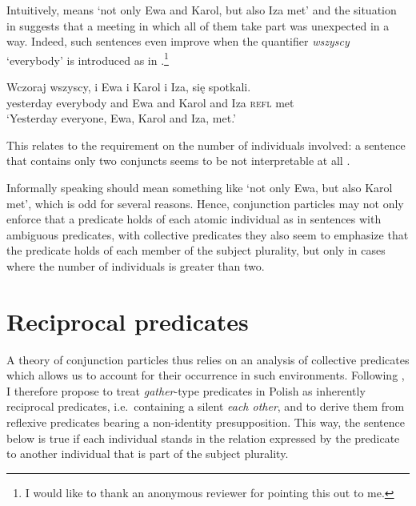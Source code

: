 \documentclass[output=paper]{langscibook}
\begin{document}
\noindent Intuitively,  means `not only Ewa and Karol, but also Iza met' and the situation in  suggests that a meeting in which all of them take part was unexpected in a way. Indeed, such sentences even improve when the quantifier \textit{wszyscy} `everybody' is introduced as in .\footnote{I would like to thank an anonymous reviewer for pointing this out to me.}

\ea\label{ros:wsz} \gll Wczoraj wszyscy, i Ewa i Karol i Iza, się spotkali. \\
yesterday everybody and Ewa and Karol and Iza \textsc{refl}  met \\
\glt `Yesterday everyone, Ewa, Karol and Iza, met.' 
\z


\noindent This relates to the requirement on the number of individuals involved: a sentence that contains only two conjuncts seems to be not interpretable at all . 

\z

\noindent Informally speaking  should mean something like `not only Ewa, but also Karol met', which is odd for several reasons. Hence, conjunction particles may not only enforce that a predicate holds of each atomic individual as in sentences with ambiguous predicates, with collective predicates they also seem to emphasize that the predicate holds of each member of the subject plurality, but only in cases where the number of individuals is greater than two.


\section{Reciprocal predicates}\label{ros:sec:5}

A theory of conjunction particles thus relies on an analysis of collective predicates which allows us to account for their occurrence in such environments. Following \citet{Hackl:2002}, I therefore propose to treat \textit{gather}-type predicates in Polish as inherently reciprocal predicates, i.e.~containing a silent \textit{each other}, and to derive them from reflexive predicates bearing a non-identity presupposition. This way, the sentence below is true if each individual stands in the relation expressed by the predicate to another individual that is part of the subject plurality.
\end{document}
